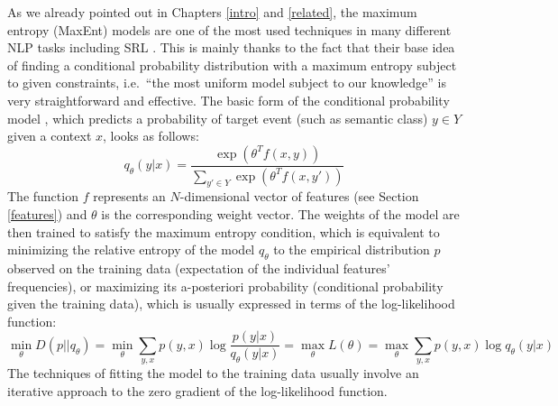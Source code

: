\documentclass[12pt,notitlepage]{report}
\begin{document}
As we already pointed out in Chapters \ref{intro} and \ref{related}, the maximum entropy (MaxEnt) models \citep[p. 219ff.]{jelinek97} are one of the most used techniques in many different NLP tasks \citep[p. 607f.]{manning00} including SRL \citep{jiang06,zhao09,che09,chen09}. This is mainly thanks to the fact that their base idea of finding a conditional probability distribution with a maximum entropy \citep[average uncertainty][p. 61]{manning00} subject to given constraints, i.e.\ ``the most uniform model subject to our knowledge'' \citep[p. 41]{berger96} is very straightforward and effective. The basic form of the conditional probability model \citep{malouf02}, which predicts a probability of target event (such as semantic class) $y\in Y$ given a context $x$, looks as follows: 
\begin{equation}
q_\theta(y|x) = \frac{\exp(\theta^T f(x,y))}{\sum_{y'\in Y} \exp(\theta^T f(x,y'))}
\end{equation}
The function $f$ represents an $N$-dimensional vector of features (see Section \ref{features}) and $\theta$ is the corresponding weight vector. The weights of the model are then trained to satisfy the maximum entropy condition, which is equivalent to minimizing the relative entropy \citep[or Kullback-Leibler Divergence;][p. 72]{manning00} of the model $q_\theta$ to the empirical distribution $p$ observed on the training data (expectation of the individual features' frequencies), or maximizing its a-posteriori probability (conditional probability given the training data), which is usually expressed in terms of the log-likelihood function:
\begin{equation}\label{eq:maxent}
\min_\theta D(p||q_\theta) = \min_\theta \sum_{y,x} p(y,x) \log\frac{p(y|x)}{q_\theta(y|x)} = \max_\theta L(\theta) = \max_\theta \sum_{y,x} p(y,x) \log q_\theta(y|x)
\end{equation}
The techniques of fitting the model to the training data usually involve an iterative approach to the zero gradient of the log-likelihood function.
\end{document}
